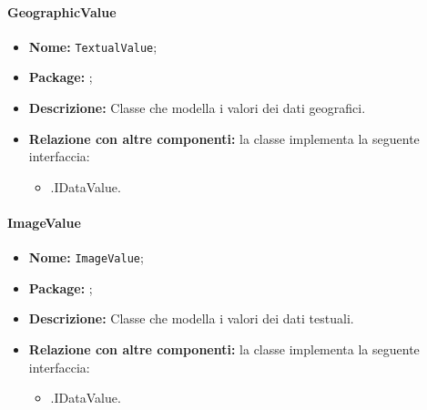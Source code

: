 \paragraph{GeographicValue}
\begin{itemize}
\item \textbf{Nome:} \texttt{TextualValue};
\item \textbf{Package:} \texttt{\smodel{}};
\item \textbf{Descrizione:} Classe che modella i valori dei dati geografici.
\item \textbf{Relazione con altre componenti:} la classe implementa la seguente interfaccia:
		\begin{itemize}
			\item \smodel{}.IDataValue.
		\end{itemize}
\end{itemize}

\paragraph{ImageValue}
\begin{itemize}
\item \textbf{Nome:} \texttt{ImageValue};
\item \textbf{Package:} \texttt{\smodel{}};
\item \textbf{Descrizione:} Classe che modella i valori dei dati testuali.
\item \textbf{Relazione con altre componenti:} la classe implementa la seguente interfaccia:
		\begin{itemize}
			\item \smodel{}.IDataValue.
		\end{itemize}
\end{itemize}
